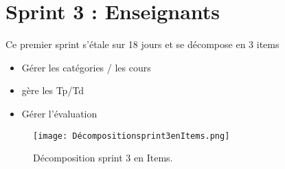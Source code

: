 \clearpage
\section{Sprint 3 : Enseignants }
\label{sec:conception}

\begin{fquote}
	Ce premier sprint s’étale sur 18 jours et se décompose en 3 items
\end{fquote}
\smallskip
\begin{itemize}[label=$\diamond$]
	\item Gérer les catégories / les cours 
	
	\item  gère les Tp/Td
	\item  Gérer l'évaluation
	
\end{itemize}
\medskip
\medskip
\medskip
\medskip
\medskip
\medskip
\medskip
\medskip
\medskip
\medskip
\medskip
\begin{figure}[ht]
	\centering
	\texttt{[image: Décompositionsprint3enItems.png]}
	\caption{Décomposition sprint 3 en Items.}
	\label{fig:Décomposition srint 3 en Items}
\end{figure}
\FloatBarrier
\clearpage








